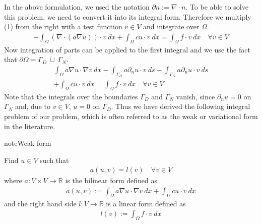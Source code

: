 \documentclass[letterpaper,10pt,english, openany]{sphinxmanual}
\begin{document}
In the above formulation, we used the notation \(\partial n := \nabla \cdot n\).
To be able to solve this problem, we need to convert it into its integral form.
Therefore we multiply (1) from the right with a test function \(v \in V\) and integrate over \(\Omega\).
\begin{equation*}
\begin{split}-\int_{\Omega} \left(\nabla \cdot \left( a \nabla u\right)\right) \cdot v\ dx
+ \int_{\Omega} c u \cdot v\ dx
= \int_{\Omega} f \cdot v\ dx \quad \forall v \in V\end{split}
\end{equation*}
Now integration of parts can be applied to the first integral and we use the fact that \(\partial \Omega = \Gamma_D\ \dot\cup\ \Gamma_N\).
\begin{equation*}
\begin{split}\int_{\Omega} a \nabla u \cdot \nabla v\ dx
-\int_{\Gamma_D} a \partial_n u \cdot v\ ds
-\int_{\Gamma_N} a \partial_n u \cdot v\ ds \\
+ \int_{\Omega} c u \cdot v\ dx
= \int_{\Omega} f \cdot v\ dx \quad \forall v \in V\end{split}
\end{equation*}
Note that the integrals over the boundaries \(\Gamma_D\) and \(\Gamma_N\) vanish,
since \(\partial_n u = 0\) on \(\Gamma_N\) and, due to \(v \in V\), \(u = 0\) on \(\Gamma_D\).
Thus we have derived the following integral problem of our problem,
which is often referred to as the weak or variational form in the literature.

\begin{sphinxadmonition}{note}{Weak form}

Find \(u \in V\) such that
\begin{equation*}
\begin{split}a(u,v) = l(v) \quad \forall v \in V\end{split}
\end{equation*}
where \(a: V \times V \rightarrow \mathbb{R}\) is the bilinear form defined as
\begin{equation*}
\begin{split}a(u,v) := \int_{\Omega} a \nabla u \cdot \nabla v\ dx + \int_{\Omega} c u \cdot v\ dx\end{split}
\end{equation*}
and the right hand side \(l: V \rightarrow \mathbb{R}\) is a linear form defined as
\begin{equation*}
\begin{split}l(v) := \int_{\Omega} f \cdot v\ dx\end{split}
\end{equation*}\end{sphinxadmonition}
\end{document}
